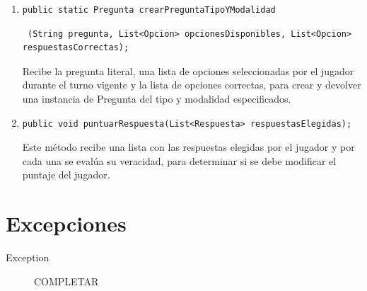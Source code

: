 \documentclass[titlepage,a4paper]{article}
\begin{document}
\begin{enumerate}
\item \begin{verbatim}public static Pregunta crearPreguntaTipoYModalidad\end{verbatim} \begin{verbatim} (String pregunta, List<Opcion> opcionesDisponibles, List<Opcion> respuestasCorrectas);\end{verbatim}
 Recibe la pregunta literal, una lista de opciones seleccionadas por el jugador durante el turno vigente y la lista de opciones correctas, para crear y devolver una instancia de Pregunta del tipo y modalidad especificados.
\item \begin{verbatim}
public void puntuarRespuesta(List<Respuesta> respuestasElegidas);\end{verbatim}
Este método recibe una lista con las respuestas elegidas por el jugador y por cada una se evalúa su veracidad, para determinar si se debe modificar el puntaje del jugador.
\end{enumerate}


\section{Excepciones}

\begin{description}
\item[Exception] COMPLETAR
\end{description}
\end{document}
